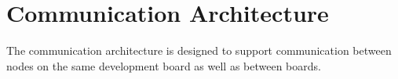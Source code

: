 \documentclass{scrreprt}
\begin{document}

\section{Communication Architecture}
The communication architecture is designed to support communication 
between nodes on the same development board as well as between boards.
\end{document}
